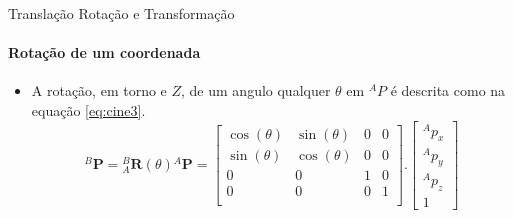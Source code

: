 \documentclass{beamer}
\begin{document}
\begin{frame}{Translação Rotação e Transformação}
    \framesubtitle{Rotação de um coordenada}
    \begin{itemize}
        \item A rotação, em torno e $Z $, de um angulo qualquer $\theta$ em ${}^AP$ é descrita como na equação \eqref{eq:cine3}. 
        \begin{equation}\label{eq:cine3}
            {}^B\mathbf{P} = {}_A^B \mathbf{R}(\theta) {}^A\mathbf{P} = 
            \begin{bmatrix}
            \cos(\theta) & \sin(\theta) & 0 & 0\\
            \sin(\theta) & \cos(\theta) & 0 & 0\\
            0 & 0 & 1 & 0\\ 
            0 & 0 & 0 & 1\\
            \end{bmatrix}.
            \begin{bmatrix}
            {}^Ap_x\\
            {}^Ap_y\\
            {}^Ap_z\\
            1
            \end{bmatrix}
            \end{equation}
    \end{itemize}
\end{frame}
\end{document}
